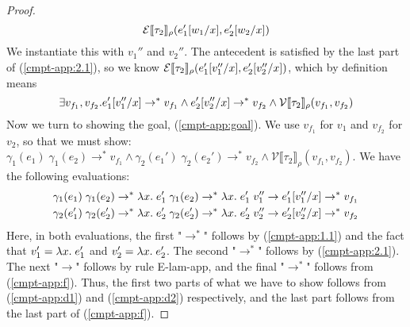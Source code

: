 \documentclass[twoside,11pt,openright]{report}
\theoremstyle{definition}
\newcommand{\var}{x}
\newcommand{\expr}{e}
\newcommand{\val}{v}
\newcommand{\valB}{w}
\newcommand{\subst}[3]{#1{\left[#3 \middle/ #2 \right]}}
\newcommand{\typ}{\tau}
\newcommand{\step}{\rightarrow}
\newcommand{\stepS}{\rightarrow^*}
\newcommand{\ValInp}[2]{\mathcal{V} \llbracket #1 \rrbracket_{#2}}
\newcommand{\ExpInp}[2]{\mathcal{E} \llbracket #1 \rrbracket_{#2}}
\begin{document}
\begin{proof}
\begin{equation}
    \ExpInp{\typ_2}{\rho}(\subst{\expr_1'}{\var}{\valB_1}, \subst{\expr_2'}{\var}{\valB_2})
  \end{equation}
  We instantiate this with $\val_1''$ and $\val_2''$. The antecedent is satisfied by the last part of (\ref*{cmpt-app:2.1}), so we know $\ExpInp{\typ_2}{\rho}(\subst{\expr_1'}{\var}{\val_1''}, \subst{\expr_2'}{\var}{\val_2''})$, which by definition means
  \begin{equation}
    \exists \val_{f_1}, \val_{f_2} . \subst{\expr_1'}{\var}{\val_1''} \stepS \val_{f_1} \land \subst{\expr_2'}{\var}{\val_2''} \stepS \val_{f_2} \land \ValInp{\typ_2}{\rho}(\val_{f_1}, \val_{f_2})\label{cmpt-app:f}
  \end{equation}
  Now we turn to showing the goal, (\ref*{cmpt-app:goal}). We use $\val_{f_1}$ for $\val_1$ and $\val_{f_2}$ for $\val_2$, so that we must show:
  $\gamma_1(\expr_1) \; \gamma_1(\expr_2) \stepS \val_{f_1} \land \gamma_2(\expr_1') \; \gamma_2(\expr_2') \stepS \val_{f_2} \land \ValInp{\typ_2}{\rho}(\val_{f_1}, \val_{f_2})$. We have the following evaluations:
  \begin{align}
    &\gamma_1(\expr_1) \; \gamma_1(\expr_2) \stepS \fun \var . \expr_1' \; \gamma_1(\expr_2) \stepS \fun \var . \expr_1' \; \val_1'' \step \subst{\expr_1'}{\var}{\val_1''} \stepS \val_{f_1}\label{cmpt-app:d1}\\
    &\gamma_2(\expr_1') \; \gamma_2(\expr_2') \stepS \fun \var . \expr_2' \; \gamma_2(\expr_2') \stepS \fun \var . \expr_2' \; \val_2'' \step \subst{\expr_2'}{\var}{\val_2''} \stepS \val_{f_2}\label{cmpt-app:d2}
  \end{align}
  Here, in both evaluations, the first "$\stepS$" follows by (\ref*{cmpt-app:1.1}) and the fact that $\val_1' = \fun \var . \expr_1'$ and $\val_2' = \fun \var . \expr_2'$. The second "$\stepS$" follows by (\ref*{cmpt-app:2.1}). The next "$\step$" follows by rule E-lam-app, and the final "$\stepS$" follows from (\ref*{cmpt-app:f}). Thus, the first two parts of what we have to show follows from (\ref{cmpt-app:d1}) and (\ref*{cmpt-app:d2}) respectively, and the last part follows from the last part of (\ref*{cmpt-app:f}).
\end{proof}
\end{document}
